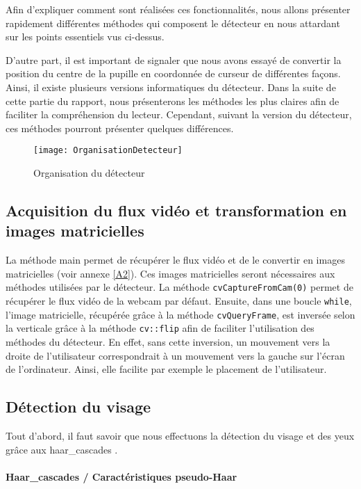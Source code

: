 Afin d’expliquer comment sont réalisées ces fonctionnalités, nous allons présenter rapidement différentes méthodes qui composent le détecteur en nous attardant sur les points essentiels vus ci-dessus.

D’autre part, il est important de signaler que nous avons essayé de convertir la position du centre de la pupille en coordonnée de curseur de différentes façons. Ainsi, il existe plusieurs versions informatiques du détecteur. Dans la suite de cette partie du rapport, nous présenterons les méthodes les plus claires afin de faciliter la compréhension du lecteur. Cependant, suivant la version du détecteur, ces méthodes pourront présenter quelques différences.

\begin{figure}[H]
  \centering
  \texttt{[image: OrganisationDetecteur]}
  \caption{Organisation du détecteur}
  \label{fig:OrganisationDetecteur}
\end{figure}

\subsection{Acquisition du flux vidéo et transformation en images matricielles}

La méthode main permet de récupérer le flux vidéo et de le convertir en images matricielles (voir annexe \ref{A2}). Ces images matricielles seront nécessaires aux méthodes utilisées par le détecteur. La méthode \lstinline=cvCaptureFromCam(0)= permet de récupérer le flux vidéo de la webcam par défaut. Ensuite, dans une boucle \lstinline=while=, l’image matricielle, récupérée grâce à la méthode \lstinline=cvQueryFrame=, est inversée selon la verticale grâce à la méthode \lstinline=cv::flip= afin de faciliter l’utilisation des méthodes du détecteur. En effet, sans cette inversion, un mouvement vers la droite de l’utilisateur correspondrait à un mouvement vers la gauche sur l’écran de l’ordinateur. Ainsi, elle facilite par exemple le placement de l’utilisateur.

\subsection{Détection du visage}

Tout d’abord, il faut savoir que nous effectuons la détection du visage et des yeux grâce aux haar\_cascades  \cite{lienhart2002extended}\cite{viola2001rapid}.

\paragraph{Haar\_cascades / Caractéristiques pseudo-Haar}

